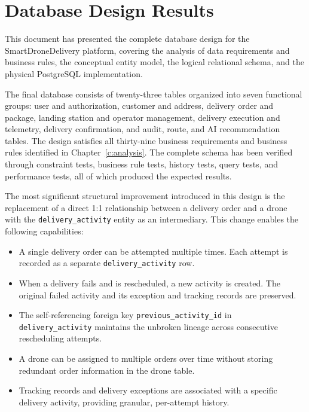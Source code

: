 
\section{Database Design Results}\label{s:results}

\qquad This document has presented the complete database design for the SmartDroneDelivery platform, covering the analysis of data requirements and business rules, the conceptual entity model, the logical relational schema, and the physical PostgreSQL implementation.

The final database consists of twenty-three tables organized into seven functional groups: user and authorization, customer and address, delivery order and package, landing station and operator management, delivery execution and telemetry, delivery confirmation, and audit, route, and AI recommendation tables. The design satisfies all thirty-nine business requirements and business rules identified in Chapter~\ref{c:analysis}. The complete schema has been verified through constraint tests, business rule tests, history tests, query tests, and performance tests, all of which produced the expected results.

The most significant structural improvement introduced in this design is the replacement of a direct 1:1 relationship between a delivery order and a drone with the \texttt{delivery\_activity} entity as an intermediary. This change enables the following capabilities:

\begin{itemize}
    \item A single delivery order can be attempted multiple times. Each attempt is recorded as a separate \texttt{delivery\_activity} row.
    \item When a delivery fails and is rescheduled, a new activity is created. The original failed activity and its exception and tracking records are preserved.
    \item The self-referencing foreign key \texttt{previous\_activity\_id} in \texttt{delivery\_activity} maintains the unbroken lineage across consecutive rescheduling attempts.
    \item A drone can be assigned to multiple orders over time without storing redundant order information in the drone table.
    \item Tracking records and delivery exceptions are associated with a specific delivery activity, providing granular, per-attempt history.
\end{itemize}

